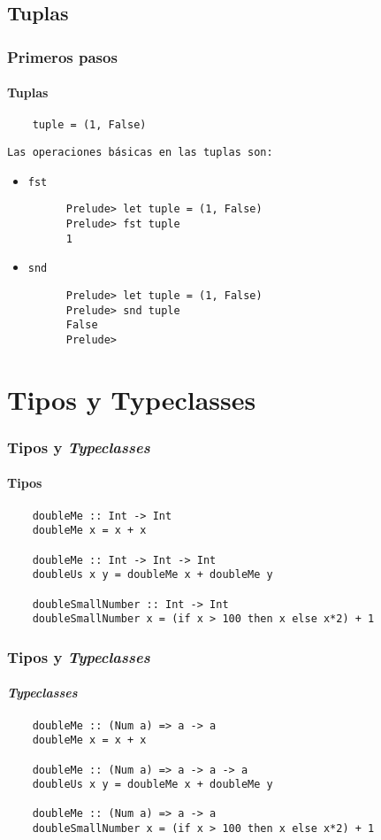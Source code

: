 \documentclass{beamer}
\begin{document}
\subsection{Tuplas}
\begin{frame}[fragile]
  \frametitle{Primeros pasos}
  \framesubtitle{Tuplas}
  \begin{verbatim}
    tuple = (1, False)
  \end{verbatim}
  \texttt{Las operaciones básicas en las tuplas son:}
  \begin{itemize}
  \item \verb~fst~
    \begin{verbatim}
      Prelude> let tuple = (1, False)
      Prelude> fst tuple
      1
    \end{verbatim}
  \item \verb~snd~
    \begin{verbatim}
      Prelude> let tuple = (1, False)
      Prelude> snd tuple
      False
      Prelude>
    \end{verbatim}
  \end{itemize}
\end{frame}

\section{Tipos y Typeclasses}
\begin{frame}[fragile]
  \frametitle{Tipos y \emph{Typeclasses}}
  \framesubtitle{Tipos}
  \begin{verbatim}
    doubleMe :: Int -> Int
    doubleMe x = x + x

    doubleMe :: Int -> Int -> Int
    doubleUs x y = doubleMe x + doubleMe y

    doubleSmallNumber :: Int -> Int
    doubleSmallNumber x = (if x > 100 then x else x*2) + 1
  \end{verbatim}
\end{frame}

\begin{frame}[fragile]
  \frametitle{Tipos y \emph{Typeclasses}}
  \framesubtitle{\emph{Typeclasses}}
  \begin{verbatim}
    doubleMe :: (Num a) => a -> a
    doubleMe x = x + x

    doubleMe :: (Num a) => a -> a -> a
    doubleUs x y = doubleMe x + doubleMe y

    doubleMe :: (Num a) => a -> a
    doubleSmallNumber x = (if x > 100 then x else x*2) + 1
  \end{verbatim}
\end{frame}
\end{document}
